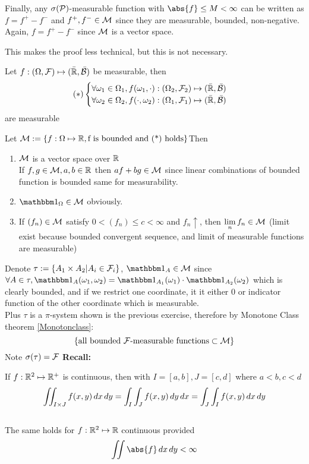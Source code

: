 Finally, any $\sigma(\mathcal{P})$-measurable function with $\abs{f}\leq M < \infty$ can be written as $f = f^+ - f^-$ and $f^+, f^- \in \mathcal{M}$ since they are measurable, bounded, non-negative. Again, $f = f^+ - f^-$ since $\mathcal{M}$ is a vector space.
\begin{rem}[Boundness of $f\in \M$] This makes the proof less technical, but this is not necessary.
\end{rem}
\begin{prop}\label{mesurability}
Let $f:(\Omega, \mathcal{F}) \mapsto (\bar{\mathbb{R}}, \bar{\mathcal{B}})$ be measurable, then 
\begin{align*}
 (*)\begin{cases}
   \forall \omega_1 \in \Omega_1, f(\omega_1, \cdot): (\Omega_2, \mathcal{F}_2) \mapsto (\bar{\mathbb{R}}, \bar{\mathcal{B}}) \\
    \forall \omega_2 \in \Omega_2, f(\cdot,\omega_2): (\Omega_1, \mathcal{F}_1) \mapsto (\bar{\mathbb{R}}, \bar{\mathcal{B}})
\end{cases}
\end{align*} are measurable
\end{prop}
\pf Let $\mathcal{M} :=\{ f:\Omega\mapsto\mathbb{R}, \text{f is bounded and (*) holds}\}$Then \begin{enumerate}
    \item $\mathcal{M}$ is a vector space over $\mathbb{R}$ \\
    If $f,g\in \mathcal{M}, a,b\in \mathbb{R}$ then $af+bg \in \mathcal{M}$ since linear combinations of bounded function is bounded same for measurability.
    \item $\I_\Omega \in \M$ obviously.
    \item If $(f_n) \in \mathcal{M}$ satisfy $ 0<(f_n)\leq c < \infty$ and $f_n \uparrow$, then $\lim\limits_{n} f_n \in \mathcal{M}$ (limit exist because bounded convergent sequence, and limit of measurable functions are measurable)
\end{enumerate}Denote $\tau:= \{A_1 \times A_2 | A_i\in \mathcal{F}_i\}$, $\I_A \in \M$ since $\forall A\in \tau, \I_A{(\omega_1, \omega_2)} = \I_{A_1}(\omega_1)\cdot \I_{A_2}(\omega_2)$ which is clearly bounded, and if we restrict one coordinate, it it either 0 or indicator function of the other coordinate which is measurable.\\
Plus $\tau$ is a $\pi$-system shown is the previous exercise, therefore by Monotone Class theorem \ref{Monotonclass}:
\begin{equation*}
    \{\text{all bounded $\mathcal{F}$-measurable functions} \subset \mathcal{M}\}
\end{equation*}Note $\sigma(\tau) = \mathcal{F}$ 
\newpage
\textbf{Recall:}
\begin{thm}
If $f:\mathbb{R}^2 \mapsto\mathbb{R}^+$ is continuous, then with $I = [a,b], J = [c,d]$ where $a<b, c<d$ 
\begin{equation*}
    \iint_{I\times J} f(x,y) \mathop{}\!d x\mathop{}\!d y = \int_I \int_J f(x,y) \mathop{}\!d y\mathop{}\!d x = \int_J \int_I f(x,y) \mathop{}\!d x\mathop{}\!d y
\end{equation*} \\
The same holds for $f:\mathbb{R}^2 \mapsto\mathbb{R}$ continuous provided
\begin{equation*}
    \iint \abs{f} \diff x\diff y < \infty
\end{equation*}
\end{thm}
